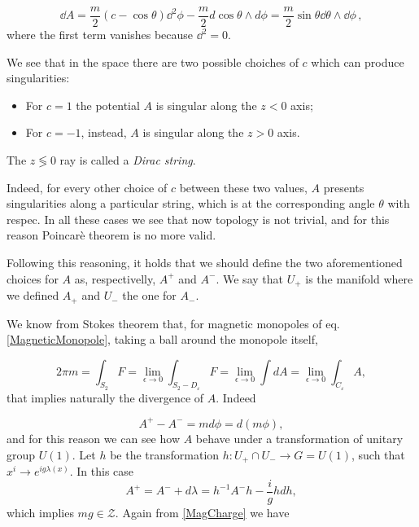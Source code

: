 \documentclass[main.tex]{subfiles}
\begin{document}
\begin{equation}
\dd{A}=\frac{m}{2}\left(c-\cos\theta\right)\dd^2\phi-\frac{m}{2}d\cos\theta\wedge d \phi=\frac{m}{2}\sin\theta \dd{\theta}\wedge \dd{\phi}\,,
\end{equation}
where the first term vanishes because \(\dd^2 = 0\).

We see that in the space there are two possible choiches of $c$ which can produce singularities:

\begin{itemize}
\item For $c=1$ the potential \(A\) is singular along the \(z<0\) axis;
\item For $c=-1$, instead, \(A\) is singular along the \(z>0\) axis.
\end{itemize}

The \(z \lessgtr 0\) ray is called a \emph{Dirac string}.

Indeed, for every other choice of $c$ between these two values, $A$ presents singularities along a particular string, which is at the corresponding angle $\theta$ with respec. In all these cases we see that now topology is not trivial, and for this reason Poincarè theorem is no more valid.


Following this reasoning, it holds that we should define the two aforementioned choices for $A$ as, respectivelly, $A^+$ and $A^-$. We say that $U_+$ is the manifold where we defined $A_+$ and $U_-$ the one for $A_-$.

We know from Stokes theorem that, for magnetic monopoles of eq. \eqref{MagneticMonopole}, taking a ball around the monopole itself,

\begin{equation}\label{MagCharge}
2\pi m=\int_{S_2} F=\lim_{\epsilon\to 0}\int_{S_2-D_{\varepsilon}}F=\lim_{\epsilon\to 0}\int dA=\lim_{\epsilon\to 0}\int_{C_{\varepsilon}} A,
\end{equation}
that implies naturally the divergence of $A$. Indeed

\begin{equation}
A^+-A^-=md\phi=d(m\phi),
\end{equation}
and for this reason we can see how $A$ behave under a transformation of unitary group $U(1)$.
Let $h$ be the transformation $h:U_+\cap U_- \to G=U(1)$, such that $x^i\to e^{ig\lambda(x)}$. In this case
\begin{equation}
A^+=A^-+d\lambda=h^{-1}A^-h-\frac{i}{g}h dh,
\end{equation}
which implies $mg\in \mathcal{Z}$. Again from \eqref{MagCharge} we have
\end{document}
